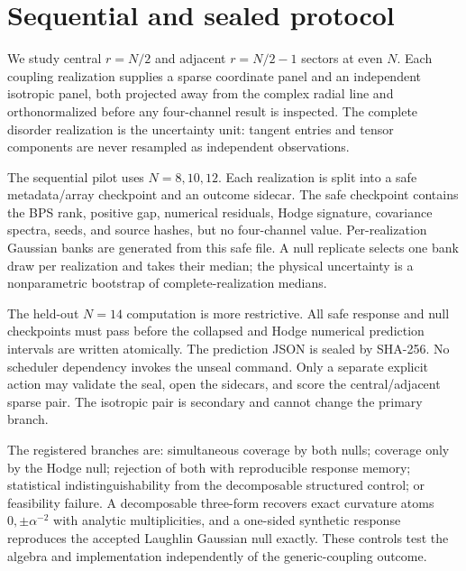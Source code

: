 \section{Sequential and sealed protocol}
\label{sec:protocol}

We study central \(r=N/2\) and adjacent \(r=N/2-1\) sectors at even \(N\). Each coupling realization supplies a sparse coordinate panel and an independent isotropic panel, both projected away from the complex radial line and orthonormalized before any four-channel result is inspected. The complete disorder realization is the uncertainty unit: tangent entries and tensor components are never resampled as independent observations.

The sequential pilot uses \(N=8,10,12\). Each realization is split into a safe metadata/array checkpoint and an outcome sidecar. The safe checkpoint contains the BPS rank, positive gap, numerical residuals, Hodge signature, covariance spectra, seeds, and source hashes, but no four-channel value. Per-realization Gaussian banks are generated from this safe file. A null replicate selects one bank draw per realization and takes their median; the physical uncertainty is a nonparametric bootstrap of complete-realization medians.

The held-out \(N=14\) computation is more restrictive. All safe response and null checkpoints must pass before the collapsed and Hodge numerical prediction intervals are written atomically. The prediction JSON is sealed by SHA-256. No scheduler dependency invokes the unseal command. Only a separate explicit action may validate the seal, open the sidecars, and score the central/adjacent sparse pair. The isotropic pair is secondary and cannot change the primary branch.

The registered branches are: simultaneous coverage by both nulls; coverage only by the Hodge null; rejection of both with reproducible response memory; statistical indistinguishability from the decomposable structured control; or feasibility failure. A decomposable three-form recovers exact curvature atoms \(0,\pm\alpha^{-2}\) with analytic multiplicities, and a one-sided synthetic response reproduces the accepted Laughlin Gaussian null exactly. These controls test the algebra and implementation independently of the generic-coupling outcome.

